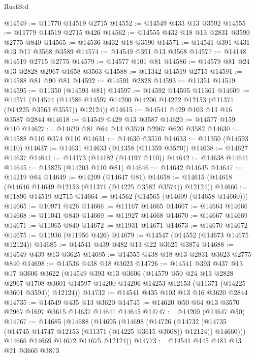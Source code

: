 \begin{lexlean}{RustStd}
\begin{coremodule}
@14549 := @11770 @14519 @2715
@14552 := @14549 @433 @13 @3592
@14555 := @11779 @14519 @2715 @426
@14562 := @14555 @432 @18 @13 @2831 @3590 @2775 @840
@14565 := @14536 @432 @18 @3590
@14571 := @14541 @391 @431 @13 @17 @3568 @3589
@14574 := @14549 @391 @13 @3568
@14577 := @14148 @14519 @2715 @2775
@14579 := @14577 @101 @81
@14586 := @14579 @81 @24 @13 @2828 @2967 @1658 @3563
@14588 := @11342 @14519 @2715
@14591 := @14588 @81 @90 @81
@14592 := @14591 @2828
@14593 := @11351 @14519
@14595 := @11350 (@14593 @81)
@14597 := @14592 @14595 @11361
@14609 := @14571
    (@14574 (@14586 @14597 @14200 @14206 @14222 @12153 (@11371 (@14225 @3563 @3557)) @12124))
@14615 := @14541 @429 @103 @13 @16 @3587 @2844
@14618 := @14549 @429 @13 @3587
@14620 := @14577 @159 @110
@14627 := @14620 @81 @64 @13 @3570 @2967 @620 @3582
@14630 := @14588 @110 @374 @110
@14631 := @14630 @3570
@14633 := @11350 (@14593 @110)
@14637 := @14631 @14633 (@11358 (@11359 @3570))
@14638 := @14627 @14637
@14641 := @14173 (@14182 (@14197 @110))
@14642 := @14638 @14641
@14645 := @13825 (@14203 @110 @81)
@14646 := @14642 @14645
@14647 := @14219 @64
@14649 := @14209 (@14647 @81)
@14658 := @14615 (@14618 (@14646 @14649 @12153 (@11371 (@14225 @3582 @3574)) @12124))
@14660 := @11896 @14519 @2715
@14664 := @14562 (@14565 (@14609 (@14658 @14660)))
@14665 := @10971 @426
@14666 := @11167 @14665
@14667 := @14664 @14666
@14668 := @11041 @840
@14669 := @11927 @14668
@14670 := @14667 @14669
@14671 := @11065 @840
@14672 := @11931 @14671
@14673 := @14670 @14672
@14675 := @11936 (@11956 @426)
@14679 := @14547 (@14552 (@14673 @14675 @12124))
@14685 := @14541 @439 @482 @13 @22 @3625 @3874
@14688 := @14549 @439 @13 @3625
@14695 := @14555 @438 @18 @13 @2831 @3623 @2775 @840
@14698 := @14536 @438 @18 @3623
@14726 := @14541
    @393
    @437
    @13
    @17
    @3606
    @3622
    (@14549
      @393
      @13
      @3606
      (@14579
        @50
        @24
        @13
        @2828
        @2967
        @1708
        @3601
        @14597
        @14200
        @14206
        @14253
        @12153
        (@11371 (@14225 @3601 @3594))
        @12124))
@14732 := @14541 @435 @103 @13 @16 @3620 @2844
@14735 := @14549 @435 @13 @3620
@14745 := @14620 @50 @64 @13 @3570 @2967 @1697 @3615 @14637 @14641 @14645
@14747 := @14209 (@14647 @50)
@14767 := @14685
    (@14688
      (@14695
        (@14698
          (@14726
            (@14732 (@14735 (@14745 @14747 @12153 (@11371 (@14225 @3615 @3608)) @12124)) @14660)))
        @14666
        @14669
        @14672
        @14675
        @12124))
@14773 := @14541 @445 @481 @13 @21 @3660 @3873

\end{coremodule}
\end{lexlean}
